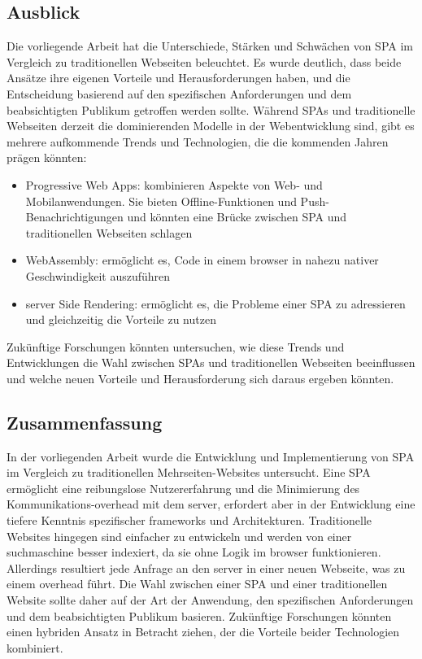 \subsection{Ausblick}
Die vorliegende Arbeit hat die Unterschiede, Stärken und Schwächen von \ac{SPA} im Vergleich zu traditionellen Webseiten beleuchtet.
Es wurde deutlich, dass beide Ansätze ihre eigenen Vorteile und Herausforderungen haben, und die Entscheidung basierend auf den spezifischen Anforderungen und dem beabsichtigten Publikum getroffen werden sollte.
Während SPAs und traditionelle Webseiten derzeit die dominierenden Modelle in der Webentwicklung sind, gibt es mehrere aufkommende Trends und Technologien, die die kommenden Jahren prägen könnten:

\begin{itemize}
    \item Progressive Web Apps: kombinieren Aspekte von Web- und Mobilanwendungen. Sie bieten Offline-Funktionen und Push-Benachrichtigungen und könnten eine Brücke zwischen \ac{SPA} und traditionellen Webseiten schlagen
    \item WebAssembly: ermöglicht es, Code in einem \gls{browser} in nahezu nativer Geschwindigkeit auszuführen
    \item \gls{server} Side Rendering: ermöglicht es, die Probleme einer \ac{SPA} zu adressieren und gleichzeitig die Vorteile zu nutzen
\end{itemize}

Zukünftige Forschungen könnten untersuchen, wie diese Trends und Entwicklungen die Wahl zwischen SPAs und traditionellen Webseiten beeinflussen und welche neuen Vorteile und Herausforderung sich daraus ergeben könnten.

\subsection{Zusammenfassung}
In der vorliegenden Arbeit wurde die Entwicklung und Implementierung von \ac{SPA} im Vergleich zu traditionellen Mehrseiten-Websites untersucht.
Eine \ac{SPA} ermöglicht eine reibungslose Nutzererfahrung und die Minimierung des Kommunikations-\gls{overhead} mit dem \gls{server}, erfordert aber in der Entwicklung eine tiefere Kenntnis spezifischer \gls{framework}s und Architekturen.
Traditionelle Websites hingegen sind einfacher zu entwickeln und werden von einer \gls{suchmaschine} besser indexiert, da sie ohne Logik im \gls{browser} funktionieren.
Allerdings resultiert jede Anfrage an den \gls{server} in einer neuen Webseite, was zu einem \gls{overhead} führt.
Die Wahl zwischen einer \ac{SPA} und einer traditionellen Website sollte daher auf der Art der Anwendung, den spezifischen Anforderungen und dem beabsichtigten Publikum basieren.
Zukünftige Forschungen könnten einen hybriden Ansatz in Betracht ziehen, der die Vorteile beider Technologien kombiniert.